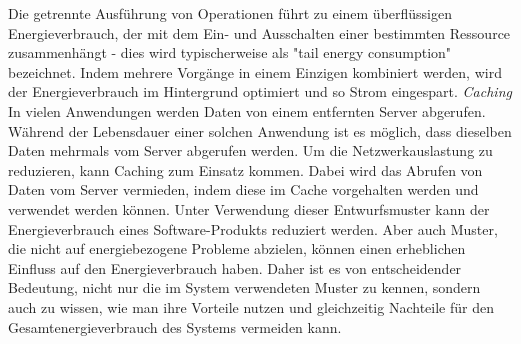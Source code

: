 \documentclass[utf8,biblatex]{lni}
\begin{document}
Die getrennte Ausführung von Operationen führt zu einem überflüssigen Energieverbrauch, der mit dem Ein- und Ausschalten einer bestimmten Ressource zusammenhängt - dies wird typischerweise als "tail energy consumption" bezeichnet. Indem mehrere Vorgänge in einem Einzigen kombiniert werden, wird der Energieverbrauch im Hintergrund optimiert und so Strom eingespart. \cite{Calero21}
\newline \newline \textit{Caching} \newline
In vielen Anwendungen werden Daten von einem entfernten Server abgerufen. Während der Lebensdauer einer solchen Anwendung ist es möglich, dass dieselben Daten mehrmals vom Server abgerufen werden. Um die Netzwerkauslastung zu reduzieren, kann Caching zum Einsatz kommen. Dabei wird das Abrufen von Daten vom Server vermieden, indem diese im Cache vorgehalten werden und verwendet werden können. \cite{Calero21}
\newline
\newline
Unter Verwendung dieser Entwurfsmuster kann der Energieverbrauch eines Software-Produkts reduziert werden. Aber auch Muster, die nicht auf energiebezogene Probleme abzielen, können einen erheblichen Einfluss auf den Energieverbrauch haben. Daher ist es von entscheidender Bedeutung, nicht nur die im System verwendeten Muster zu kennen, sondern auch zu wissen, wie man ihre Vorteile nutzen und gleichzeitig Nachteile für den Gesamtenergieverbrauch des Systems vermeiden kann. \cite{Calero21}
\end{document}
